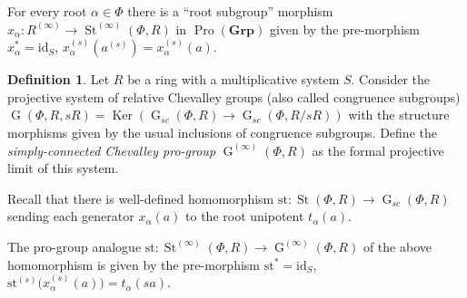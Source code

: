 \documentclass{article}
\theoremstyle{definition}
\newtheorem{df}[lemma]{Definition} \Crefname{df}{Definition}{Definitions}
\theoremstyle{remark}
\DeclareMathOperator\St{St}
\DeclareMathOperator\Ker{Ker}
\DeclareMathOperator\GG{G}
\DeclareMathOperator{\Pro}{Pro}
\newcommand{\Group}{\mathbf{Grp}}
\begin{document}
For every root $\alpha \in \Phi$ there is a ``root subgroup'' morphism $x_{\alpha} \colon R^{(\infty)} \to \St^{(\infty)}(\Phi, R)$ in $\Pro(\Group)$ given by the pre-morphism $x_\alpha^* = \mathrm{id}_S$, $x_\alpha^{(s)}(a^{(s)}) = x_\alpha^{(s)}(a)$.

\begin{df}
 Let $R$ be a ring with a multiplicative system $S$.
 Consider the projective system of relative Chevalley groups (also called congruence subgroups) 
 $\GG(\Phi, R, sR) = \Ker\left(\GG_{sc}(\Phi, R) \to \GG_{sc}(\Phi, R/sR)\right)$ with the structure morphisms given by the usual inclusions of congruence subgroups. Define the {\it simply-connected Chevalley pro-group} $\GG^{(\infty)}(\Phi, R)$ as the formal projective limit of this system.
\end{df}

Recall that there is well-defined homomorphism $\mathrm{st}\colon \St(\Phi, R) \to \GG_{sc}(\Phi, R)$ sending each generator $x_\alpha(a)$ to the root unipotent $t_\alpha(a)$. 

The pro-group analogue \(\mathrm{st} \colon \St^{(\infty)}(\Phi, R) \to \GG^{(\infty)}(\Phi, R)\) of the above homomorphism is given by the pre-morphism \(\mathrm{st}^* = \mathrm{id}_S\), \(\mathrm{st}^{(s)}\bigl(x_{\alpha}^{(s)}(a)\bigr) = t_\alpha(sa)\). 
\end{document}

